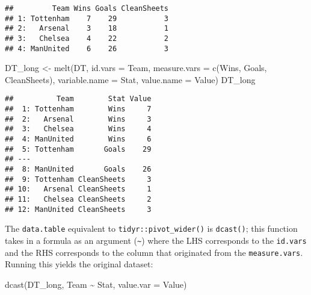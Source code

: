 \documentclass[
]{book}
\newenvironment{Shaded}{\begin{snugshade}}{\end{snugshade}}
\newcommand{\AttributeTok}[1]{\textcolor[rgb]{0.77,0.63,0.00}{#1}}
\newcommand{\FunctionTok}[1]{\textcolor[rgb]{0.00,0.00,0.00}{#1}}
\newcommand{\NormalTok}[1]{#1}
\newcommand{\OtherTok}[1]{\textcolor[rgb]{0.56,0.35,0.01}{#1}}
\newcommand{\SpecialCharTok}[1]{\textcolor[rgb]{0.00,0.00,0.00}{#1}}
\newcommand{\StringTok}[1]{\textcolor[rgb]{0.31,0.60,0.02}{#1}}
\begin{document}
\begin{verbatim}
##         Team Wins Goals CleanSheets
## 1: Tottenham    7    29           3
## 2:   Arsenal    3    18           1
## 3:   Chelsea    4    22           2
## 4: ManUnited    6    26           3
\end{verbatim}

\begin{Shaded}
\begin{Highlighting}[]
\NormalTok{DT\_long }\OtherTok{\textless{}{-}} \FunctionTok{melt}\NormalTok{(DT, }\AttributeTok{id.vars =} \StringTok{\textquotesingle{}Team\textquotesingle{}}\NormalTok{, }\AttributeTok{measure.vars =} \FunctionTok{c}\NormalTok{(}\StringTok{\textquotesingle{}Wins\textquotesingle{}}\NormalTok{, }\StringTok{\textquotesingle{}Goals\textquotesingle{}}\NormalTok{, }\StringTok{\textquotesingle{}CleanSheets\textquotesingle{}}\NormalTok{),}
                \AttributeTok{variable.name =} \StringTok{\textquotesingle{}Stat\textquotesingle{}}\NormalTok{, }\AttributeTok{value.name =} \StringTok{\textquotesingle{}Value\textquotesingle{}}\NormalTok{)}
\NormalTok{DT\_long}
\end{Highlighting}
\end{Shaded}

\begin{verbatim}
##          Team        Stat Value
##  1: Tottenham        Wins     7
##  2:   Arsenal        Wins     3
##  3:   Chelsea        Wins     4
##  4: ManUnited        Wins     6
##  5: Tottenham       Goals    29
## ---                            
##  8: ManUnited       Goals    26
##  9: Tottenham CleanSheets     3
## 10:   Arsenal CleanSheets     1
## 11:   Chelsea CleanSheets     2
## 12: ManUnited CleanSheets     3
\end{verbatim}

The \texttt{data.table} equivalent to \texttt{tidyr::pivot\_wider()} is \texttt{dcast()}; this function takes in a formula as an argument (\texttt{\textasciitilde{}}) where the LHS corresponds to the \texttt{id.vars} and the RHS corresponds to the column that originated from the \texttt{measure.vars}. Running this yields the original dataset:

\begin{Shaded}
\begin{Highlighting}[]
\FunctionTok{dcast}\NormalTok{(DT\_long, Team }\SpecialCharTok{\textasciitilde{}}\NormalTok{ Stat, }\AttributeTok{value.var =} \StringTok{\textquotesingle{}Value\textquotesingle{}}\NormalTok{)}
\end{Highlighting}
\end{Shaded}
\end{document}
